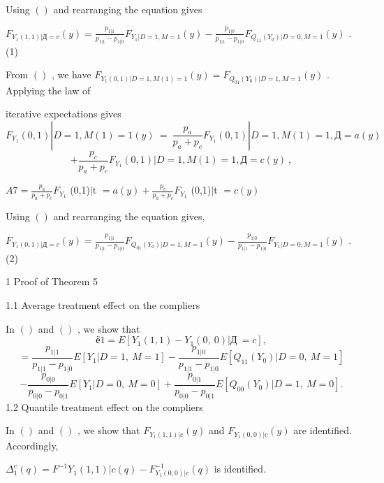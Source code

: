 \documentclass[a4paper,12pt]{article}
\begin{document}
Using $()$ and rearranging the equation gives

$F_{Y_{1}(1,1)|Д=c}(y)=\displaystyle \frac{p_{1|1}}{p_{1|1}-p_{1|0}}F_{Y_{1}|D=1,M=1}(y)-\frac{p_{1|0}}{p_{1|1}-p_{1|0}}F_{Q_{11}(Y_{0})|D=0,M=1}(y)$ . (1)

From $()$ , we have $F_{Y_{1}(0,1)|D=1,M(1)=1}(y) = F_{Q_{01}(Y_{0})|D=1,M=1}(y)$ . Applying the law of

iterative expectations gives
$$
F_{Y_{1}}(0,1)|D=1,M(1)=1(y)\ =\ \frac{p_{a}}{p_{a}+p_{c}}F_{Y_{1}}(0,1)|D=1,M(1)=1,Д=a(y)
$$
$$
+\frac{p_{c}}{p_{a}+p_{c}}F_{Y_{1}}(0,1)|D=1,M(1)=1,Д=c(y)\ ,
$$
\begin{center}
$A7= \displaystyle \frac{p_{a}}{p_{a}+p_{c}}F_{Y_{1}}$ (0,1)$|$t $=a(y) + \displaystyle \frac{p_{c}}{p_{a}+p_{c}}F_{Y_{1}}$ (0,1)$|$t $=c(y)$
\end{center}
Using $()$ and rearranging the equation gives,

$F_{Y_{1}(0,1)|Д=c}(y)=\displaystyle \frac{p_{1|1}}{p_{1|1}-p_{1|0}}F_{Q_{01}(Y_{0})|D=1,M=1}(y)-\frac{p_{1|0}}{p_{1|1}-p_{1|0}}F_{Y_{1}|D=0,M=1}(y)$ . (2)

1 Proof of Theorem 5

1.1 Average treatment effect on the compliers

In $()$ and $()$ , we show that
$$
ё 1=E[Y_{1}(1,1)-Y_{1}(0,\ 0)|Д\ =c],
$$
$$
=\frac{p_{1|1}}{p_{1|1}-p_{1|0}}E[Y_{1}|D=1,\ M=1]-\frac{p_{1|0}}{p_{1|1}-p_{1|0}}E[Q_{11}(Y_{0})|D=0,\ M=1]
$$
$$
-\frac{p_{0|0}}{p_{0|0}-p_{0|1}}E[Y_{1}|D=0,\ M=0]+\frac{p_{0|1}}{p_{0|0}-p_{0|1}}E[Q_{00}(Y_{0})|D=1,\ M=0].
$$
1.2 Quantile treatment effect on the compliers

In $()$ and $()$ , we show that $F_{Y_{1}(1,1)|c}(y)$ and $F_{Y_{1}(0,0)|c}(y)$ are identified. Accordingly,

$\Delta_{1}^{c}(q)=F^{-1}Y_{1}(1,1)|c(q)-F_{Y_{1}(0,0)|c}^{-1}(q)$ is identified.
\end{document}
